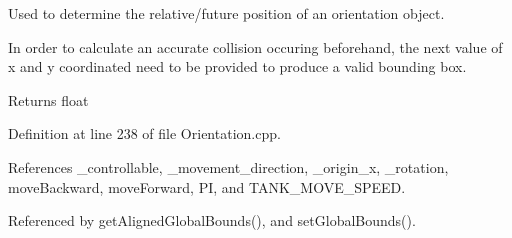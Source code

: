 Used to determine the relative/future position of an orientation object. 

In order to calculate an accurate collision occuring beforehand, the next value of x and y coordinated need to be provided to produce a valid bounding box. \begin{DoxyReturn}{Returns}
float 
\end{DoxyReturn}


Definition at line 238 of file Orientation.\-cpp.



References \-\_\-controllable, \-\_\-movement\-\_\-direction, \-\_\-origin\-\_\-x, \-\_\-rotation, move\-Backward, move\-Forward, P\-I, and T\-A\-N\-K\-\_\-\-M\-O\-V\-E\-\_\-\-S\-P\-E\-E\-D.



Referenced by get\-Aligned\-Global\-Bounds(), and set\-Global\-Bounds().


